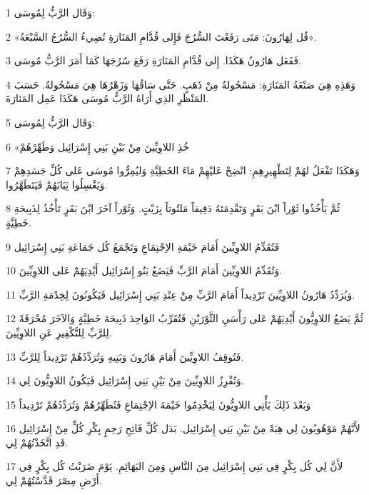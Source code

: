 \par 1 وَقَال الرَّبُّ لِمُوسَى:
\par 2 «قُل لِهَارُونَ: مَتَى رَفَعْتَ السُّرُجَ فَإِلى قُدَّامِ المَنَارَةِ تُضِيءُ السُّرُجُ السَّبْعَةُ».
\par 3 فَفَعَل هَارُونُ هَكَذَا. إِلى قُدَّامِ المَنَارَةِ رَفَعَ سُرُجَهَا كَمَا أَمَرَ الرَّبُّ مُوسَى.
\par 4 وَهَذِهِ هِيَ صَنْعَةُ المَنَارَةِ: مَسْحُولةٌ مِنْ ذَهَبٍ. حَتَّى سَاقُهَا وَزَهْرُهَا هِيَ مَسْحُولةٌ. حَسَبَ المَنْظَرِ الذِي أَرَاهُ الرَّبُّ مُوسَى هَكَذَا عَمِل المَنَارَةَ.
\par 5 وَقَال الرَّبُّ لِمُوسَى:
\par 6 «خُذِ اللاوِيِّينَ مِنْ بَيْنِ بَنِي إِسْرَائِيل وَطَهِّرْهُمْ
\par 7 وَهَكَذَا تَفْعَلُ لهُمْ لِتَطْهِيرِهِمِ: انْضِحْ عَليْهِمْ مَاءَ الخَطِيَّةِ وَليُمِرُّوا مُوسَى عَلى كُلِّ جَسَدِهِمْ وَيَغْسِلُوا ثِيَابَهُمْ فَيَتَطَهَّرُوا.
\par 8 ثُمَّ يَأْخُذُوا ثَوْراً ابْنَ بَقَرٍ وَتَقْدِمَتَهُ دَقِيقاً مَلتُوتاً بِزَيْتٍ. وَثَوْراً آخَرَ ابْنَ بَقَرٍ تَأْخُذُ لِذَبِيحَةِ خَطِيَّةٍ.
\par 9 فَتُقَدِّمُ اللاوِيِّينَ أَمَامَ خَيْمَةِ الاِجْتِمَاعِ وَتَجْمَعُ كُل جَمَاعَةِ بَنِي إِسْرَائِيل
\par 10 وَتُقَدِّمُ اللاوِيِّينَ أَمَامَ الرَّبِّ فَيَضَعُ بَنُو إِسْرَائِيل أَيْدِيَهُمْ عَلى اللاوِيِّينَ.
\par 11 وَيُرَدِّدُ هَارُونُ اللاوِيِّينَ تَرْدِيداً أَمَامَ الرَّبِّ مِنْ عِنْدِ بَنِي إِسْرَائِيل فَيَكُونُونَ لِخِدْمَةِ الرَّبِّ.
\par 12 ثُمَّ يَضَعُ اللاوِيُّونَ أَيْدِيَهُمْ عَلى رَأْسَيِ الثَّوْرَيْنِ فَتُقَرِّبُ الوَاحِدَ ذَبِيحَةَ خَطِيَّةٍ وَالآخَرَ مُحْرَقَةً لِلرَّبِّ لِلتَّكْفِيرِ عَنِ اللاوِيِّينَ.
\par 13 فَتُوقِفُ اللاوِيِّينَ أَمَامَ هَارُونَ وَبَنِيهِ وَتُرَدِّدُهُمْ تَرْدِيداً لِلرَّبِّ.
\par 14 وَتُفْرِزُ اللاوِيِّينَ مِنْ بَيْنِ بَنِي إِسْرَائِيل فَيَكُونُ اللاوِيُّونَ لِي.
\par 15 وَبَعْدَ ذَلِكَ يَأْتِي اللاوِيُّونَ لِيَخْدِمُوا خَيْمَةَ الاِجْتِمَاعِ فَتُطَهِّرُهُمْ وَتُرَدِّدُهُمْ تَرْدِيداً
\par 16 لأَنَّهُمْ مَوْهُوبُونَ لِي هِبَةً مِنْ بَيْنِ بَنِي إِسْرَائِيل. بَدَل كُلِّ فَاتِحِ رَحِمٍ بِكْرِ كُلٍّ مِنْ إِسْرَائِيل قَدِ اتَّخَذْتُهُمْ لِي.
\par 17 لأَنَّ لِي كُل بِكْرٍ فِي بَنِي إِسْرَائِيل مِنَ النَّاسِ وَمِنَ البَهَائِمِ. يَوْمَ ضَرَبْتُ كُل بِكْرٍ فِي أَرْضِ مِصْرَ قَدَّسْتُهُمْ لِي.
